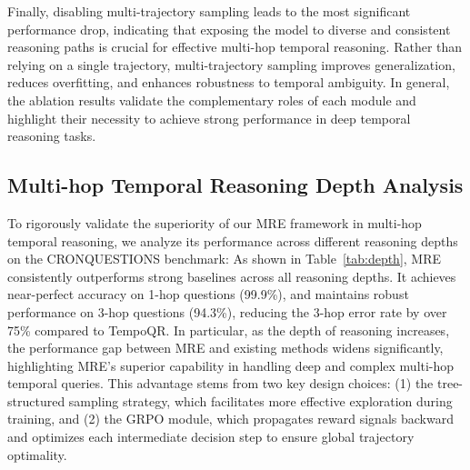 \documentclass[letterpaper]{article} %
\begin{document}
Finally, disabling multi-trajectory sampling leads to the most significant performance drop, indicating that exposing the model to diverse and consistent reasoning paths is crucial for effective multi-hop temporal reasoning.
Rather than relying on a single trajectory, multi-trajectory sampling improves generalization, reduces overfitting, and enhances robustness to temporal ambiguity.
In general, the ablation results validate the complementary roles of each module and highlight their necessity to achieve strong performance in deep temporal reasoning tasks.


\subsection{Multi-hop Temporal Reasoning Depth Analysis}
\label{subsec:depth}
\begin{table}[h]
\centering
\renewcommand{\arraystretch}{0.95}
\setlength{\tabcolsep}{4pt}
\scriptsize %
\caption{
Performance comparison of different models at various reasoning depths.
}
\label{tab:depth}
\end{table}
To rigorously validate the superiority of our MRE framework in multi-hop temporal reasoning, we analyze its performance across different reasoning depths on the CRONQUESTIONS benchmark:
As shown in Table~\ref{tab:depth}, MRE consistently outperforms strong baselines across all reasoning depths. It achieves near-perfect accuracy on 1-hop questions (99.9\%), and maintains robust performance on 3-hop questions (94.3\%), reducing the 3-hop error rate by over 75\% compared to TempoQR.
In particular, as the depth of reasoning increases, the performance gap between MRE and existing methods widens significantly, highlighting MRE’s superior capability in handling deep and complex multi-hop temporal queries. This advantage stems from two key design choices: 
(1) the tree-structured sampling strategy, which facilitates more effective exploration during training, 
and (2) the GRPO module, which propagates reward signals backward and optimizes each intermediate decision step to ensure global trajectory optimality. 
\end{document}
